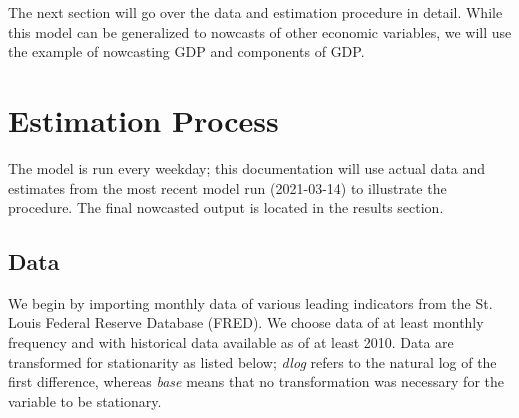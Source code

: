 \documentclass[11pt, letterpaper]{article}\usepackage[]{graphicx}\usepackage[]{color}
\begin{document}
The next section will go over the data and estimation procedure in detail. While this model can be generalized to nowcasts of other economic variables, we will use the example of nowcasting GDP and components of GDP.

\newpage
\section{Estimation Process}
The model is run every weekday; this documentation will use actual data and estimates from the most recent model run (2021-03-14) to illustrate the procedure. The final nowcasted output is located in the results section.

\subsection{Data}
We begin by importing monthly data of various leading indicators from the St. Louis Federal Reserve Database (FRED). We choose data of at least monthly frequency and with historical data available as of at least 2010. Data are transformed for stationarity as listed below; \textit{dlog} refers to the natural log of the first difference, whereas \textit{base} means that no transformation was necessary for the variable to be stationary.
\end{document}
